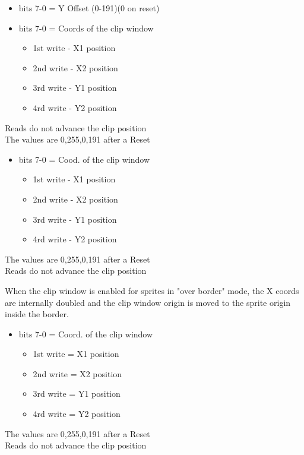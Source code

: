 \begin{itemize}
\item bits 7-0 = Y Offset (0-191)(0 on reset)
\end{itemize}

\begin{itemize}
\item bits 7-0 = Coords of the clip window
  \begin{itemize}
  \item[] 1st write - X1 position
  \item[] 2nd write - X2 position
  \item[] 3rd write - Y1 position
  \item[] 4rd write - Y2 position
  \end{itemize}
\end{itemize}
Reads do not advance the clip position\\
The values are 0,255,0,191 after a Reset

\begin{itemize}
\item bits 7-0 = Cood. of the clip window
  \begin{itemize}
  \item[] 1st write - X1 position
  \item[] 2nd write - X2 position
  \item[] 3rd write - Y1 position
  \item[] 4rd write - Y2 position
  \end{itemize}
\end{itemize}
The values are 0,255,0,191 after a Reset\\
Reads do not advance the clip position

When the clip window is enabled for sprites in "over border" mode, the
X coords are internally doubled and the clip window origin is moved to
the sprite origin inside the border.

\begin{itemize}
\item bits 7-0 = Coord. of the clip window
  \begin{itemize}
  \item[] 1st write = X1 position
  \item[] 2nd write = X2 position
  \item[] 3rd write = Y1 position
  \item[] 4rd write = Y2 position
  \end{itemize}
\end{itemize}
The values are 0,255,0,191 after a Reset\\
Reads do not advance the clip position

